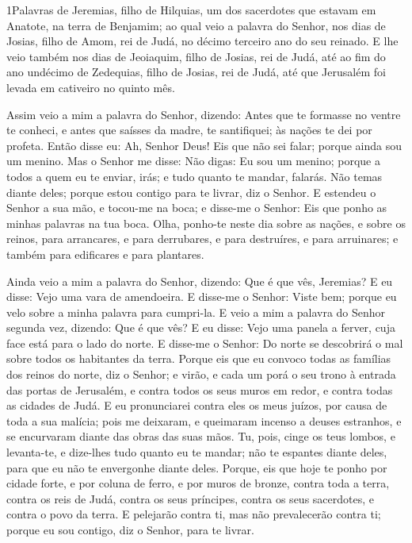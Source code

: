 
\lettrine{1} Palavras de Jeremias, filho de Hilquias, um dos
sacerdotes que estavam em Anatote, na terra de Benjamim; ao qual
veio a palavra do Senhor, nos dias de Josias, filho de Amom, rei de
Judá, no décimo terceiro ano do seu reinado. E lhe veio também
nos dias de Jeoiaquim, filho de Josias, rei de Judá, até ao fim do
ano undécimo de Zedequias, filho de Josias, rei de Judá, até que
Jerusalém foi levada em cativeiro no quinto mês.

Assim veio a mim a palavra do Senhor, dizendo: Antes que te
formasse no ventre te conheci, e antes que saísses da madre, te
santifiquei; às nações te dei por profeta. Então disse eu: Ah,
Senhor Deus! Eis que não sei falar; porque ainda sou um menino.
Mas o Senhor me disse: Não digas: Eu sou um menino; porque a
todos a quem eu te enviar, irás; e tudo quanto te mandar, falarás.
Não temas diante deles; porque estou contigo para te livrar, diz
o Senhor. E estendeu o Senhor a sua mão, e tocou-me na boca; e
disse-me o Senhor: Eis que ponho as minhas palavras na tua boca.
Olha, ponho-te neste dia sobre as nações, e sobre os reinos,
para arrancares, e para derrubares, e para destruíres, e para
arruinares; e também para edificares e para plantares.

Ainda veio a mim a palavra do Senhor, dizendo: Que é que vês,
Jeremias? E eu disse: Vejo uma vara de amendoeira. E disse-me
o Senhor: Viste bem; porque eu velo sobre a minha palavra para
cumpri-la. E veio a mim a palavra do Senhor segunda vez,
dizendo: Que é que vês? E eu disse: Vejo uma panela a ferver, cuja
face está para o lado do norte. E disse-me o Senhor: Do norte
se descobrirá o mal sobre todos os habitantes da terra.
Porque eis que eu convoco todas as famílias dos reinos do
norte, diz o Senhor; e virão, e cada um porá o seu trono à entrada
das portas de Jerusalém, e contra todos os seus muros em redor, e
contra todas as cidades de Judá. E eu pronunciarei contra
eles os meus juízos, por causa de toda a sua malícia; pois me
deixaram, e queimaram incenso a deuses estranhos, e se encurvaram
diante das obras das suas mãos. Tu, pois, cinge os teus
lombos, e levanta-te, e dize-lhes tudo quanto eu te mandar; não te
espantes diante deles, para que eu não te envergonhe diante deles.
Porque, eis que hoje te ponho por cidade forte, e por coluna
de ferro, e por muros de bronze, contra toda a terra, contra os reis
de Judá, contra os seus príncipes, contra os seus sacerdotes, e
contra o povo da terra. E pelejarão contra ti, mas não
prevalecerão contra ti; porque eu sou contigo, diz o Senhor, para te
livrar.

